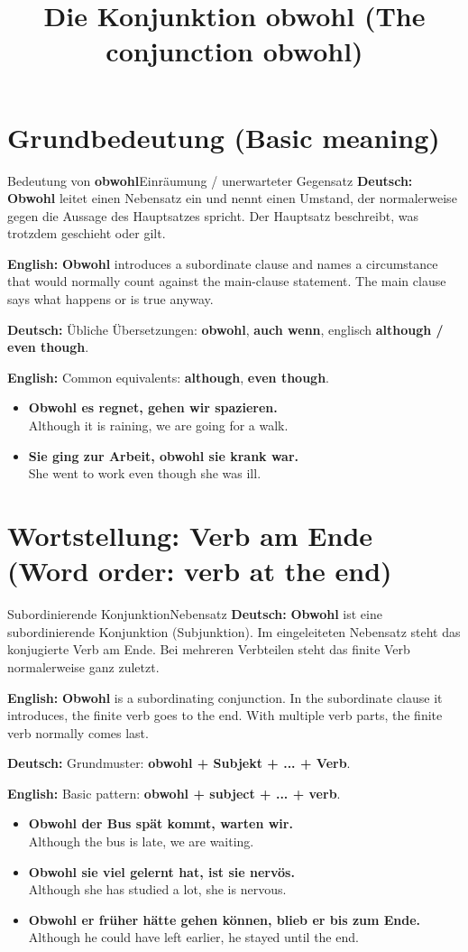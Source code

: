 \documentclass[a4paper,11pt]{article}
\title{Die Konjunktion \glqq obwohl\grqq{} \textnormal{(The conjunction \glqq obwohl\grqq)}}
\date{}
\newcommand{\GermanText}[1]{\textbf{Deutsch: }#1\par}
\newcommand{\EnglishText}[1]{{\small\color{SoftGray}\textbf{English: }#1\par}}
\newcommand{\ExampleItem}[2]{\item \textbf{#1}\\{\small\color{SoftGray}#2}}
\begin{document}
\maketitle\tableofcontents\newpage

\section{Grundbedeutung \textnormal{(Basic meaning)}}
\begin{grammarentry}{Bedeutung von \textbf{obwohl}}{Einräumung / unerwarteter Gegensatz}
\GermanText{\textbf{Obwohl} leitet einen Nebensatz ein und nennt einen Umstand, der normalerweise gegen die Aussage des Hauptsatzes spricht. Der Hauptsatz beschreibt, was trotzdem geschieht oder gilt.}
\EnglishText{\textbf{Obwohl} introduces a subordinate clause and names a circumstance that would normally count against the main-clause statement. The main clause says what happens or is true anyway.}
\GermanText{Übliche Übersetzungen: \textbf{obwohl}, \textbf{auch wenn}, englisch \textbf{although / even though}.}
\EnglishText{Common equivalents: \textbf{although}, \textbf{even though}.}
\end{grammarentry}
\begin{exbox}\begin{itemize}
\ExampleItem{Obwohl es regnet, gehen wir spazieren.}{Although it is raining, we are going for a walk.}
\ExampleItem{Sie ging zur Arbeit, obwohl sie krank war.}{She went to work even though she was ill.}
\end{itemize}\end{exbox}

\section{Wortstellung: Verb am Ende \textnormal{(Word order: verb at the end)}}
\begin{grammarentry}{Subordinierende Konjunktion}{Nebensatz}
\GermanText{\textbf{Obwohl} ist eine subordinierende Konjunktion (Subjunktion). Im eingeleiteten Nebensatz steht das konjugierte Verb am Ende. Bei mehreren Verbteilen steht das finite Verb normalerweise ganz zuletzt.}
\EnglishText{\textbf{Obwohl} is a subordinating conjunction. In the subordinate clause it introduces, the finite verb goes to the end. With multiple verb parts, the finite verb normally comes last.}
\GermanText{Grundmuster: \textbf{obwohl + Subjekt + ... + Verb}.}
\EnglishText{Basic pattern: \textbf{obwohl + subject + ... + verb}.}
\end{grammarentry}
\begin{exbox}\begin{itemize}
\ExampleItem{Obwohl der Bus spät kommt, warten wir.}{Although the bus is late, we are waiting.}
\ExampleItem{Obwohl sie viel gelernt hat, ist sie nervös.}{Although she has studied a lot, she is nervous.}
\ExampleItem{Obwohl er früher hätte gehen können, blieb er bis zum Ende.}{Although he could have left earlier, he stayed until the end.}
\end{itemize}\end{exbox}
\end{document}
